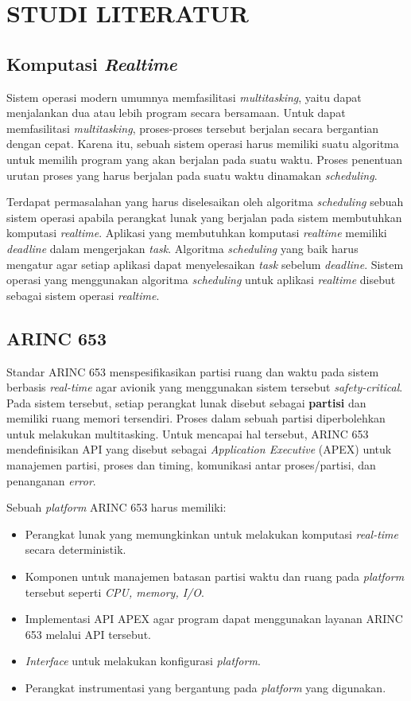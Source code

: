 \chapter{STUDI LITERATUR}

\section{Komputasi \textit{Realtime}}

Sistem operasi modern umumnya memfasilitasi \textit{multitasking}, yaitu dapat menjalankan dua atau lebih program secara
bersamaan. Untuk dapat memfasilitasi \textit{multitasking}, proses-proses tersebut berjalan secara bergantian dengan
cepat. Karena itu, sebuah sistem operasi harus memiliki suatu algoritma untuk memilih program yang akan berjalan pada
suatu waktu. Proses penentuan urutan proses yang harus berjalan pada suatu waktu dinamakan \textit{scheduling}.

Terdapat permasalahan yang harus diselesaikan oleh algoritma \textit{scheduling} sebuah sistem operasi apabila perangkat
lunak yang berjalan pada sistem membutuhkan komputasi \textit{realtime}. Aplikasi yang membutuhkan komputasi
\textit{realtime} memiliki \textit{deadline} dalam mengerjakan \textit{task}. Algoritma \textit{scheduling} yang baik
harus mengatur agar setiap aplikasi dapat menyelesaikan \textit{task} sebelum \textit{deadline}. Sistem operasi yang
menggunakan algoritma \textit{scheduling} untuk aplikasi \textit{realtime} disebut sebagai sistem operasi
\textit{realtime}.

\section{ARINC 653}

Standar ARINC 653 menspesifikasikan partisi ruang dan waktu pada sistem berbasis \textit{real-time} agar avionik yang
menggunakan sistem tersebut \textit{safety-critical}. Pada sistem tersebut, setiap perangkat lunak disebut sebagai
\textbf{partisi} dan memiliki ruang memori tersendiri. Proses dalam sebuah partisi diperbolehkan untuk melakukan
multitasking. Untuk mencapai hal tersebut, ARINC 653 mendefinisikan API yang disebut sebagai \textit{Application
Executive} (APEX) untuk manajemen partisi, proses dan timing, komunikasi antar proses/partisi, dan penanganan
\textit{error}.

Sebuah \textit{platform} ARINC 653 harus memiliki:
\begin{itemize}
    \item Perangkat lunak yang memungkinkan untuk melakukan komputasi \textit{real-time} secara deterministik.
    \item Komponen untuk manajemen batasan partisi waktu dan ruang pada \textit{platform} tersebut seperti
        \textit{CPU, memory, I/O}.
    \item Implementasi API APEX agar program dapat menggunakan layanan ARINC 653 melalui API tersebut.
    \item \textit{Interface} untuk melakukan konfigurasi \textit{platform}.
    \item Perangkat instrumentasi yang bergantung pada \textit{platform} yang digunakan.
\end{itemize}

